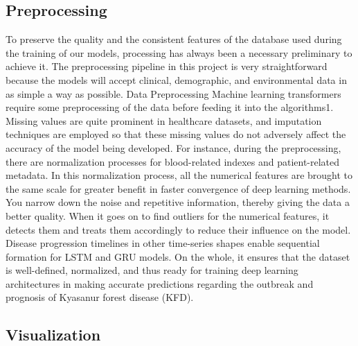 \documentclass[conference]{IEEEtran}
\begin{document}
\subsection{Preprocessing}\label{AA}
To preserve the quality and the consistent features of the database used during the training of our models, processing has always been a necessary preliminary to achieve it. The preprocessing pipeline in this project is very straightforward because the models will accept clinical, demographic, and environmental data in as simple a way as possible. Data Preprocessing Machine learning transformers require some preprocessing of the data before feeding it into the algorithms1. Missing values are quite prominent in healthcare datasets, and imputation techniques are employed so that these missing values do not adversely affect the accuracy of the model being developed. For instance, during the preprocessing, there are normalization processes for blood-related indexes and patient-related metadata. In this normalization process, all the numerical features are brought to the same scale for greater benefit in faster convergence of deep learning methods. You narrow down the noise and repetitive information, thereby giving the data a better quality. When it goes on to find outliers for the numerical features, it detects them and treats them accordingly to reduce their influence on the model. Disease progression timelines in other time-series shapes enable sequential formation for LSTM and GRU models. On the whole, it ensures that the dataset is well-defined, normalized, and thus ready for training deep learning architectures in making accurate predictions regarding the outbreak and prognosis of Kyasanur forest disease (KFD).


\subsection{Visualization}
\end{document}
